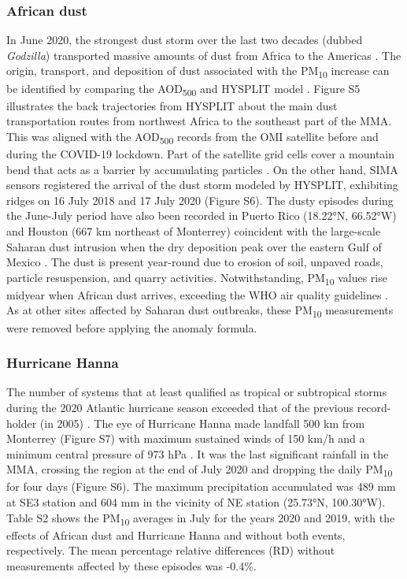 \documentclass[preprint,12pt]{elsarticle}
\begin{document}
\subsubsection*{African dust}
In June 2020, the strongest dust storm over the last two decades (dubbed \textit{Godzilla}) transported massive amounts of dust from Africa to the Americas \citep{Francis_2020}. The origin, transport, and deposition of dust associated with the PM\textsubscript{10} increase can be identified by comparing the AOD\textsubscript{500} and HYSPLIT model \citep{Yassin_2018}. Figure S5 illustrates the back trajectories from HYSPLIT about the main dust transportation routes from northwest Africa to the southeast part of the MMA. This was aligned with the AOD\textsubscript{500} records from the OMI satellite before and during the COVID-19 lockdown. Part of the satellite grid cells cover a mountain bend that acts as a barrier by accumulating particles \citep{Gonz_lez_Santiago_2011,Martinez_2012}. On the other hand, SIMA sensors registered the arrival of the dust storm modeled by HYSPLIT, exhibiting ridges on 16 July 2018 and 17 July 2020 (Figure S6). The dusty episodes during the June-July period have also been recorded in Puerto Rico (18.22°N, 66.52°W) \citep{Euphrasie_Clotilde_2020} and Houston (667 km northeast of Monterrey) coincident with the large-scale Saharan dust intrusion \citep{Bozlaker_2013} when the dry deposition peak over the eastern Gulf of Mexico \citep{Lenes_2012}. The dust is present year-round due to erosion of soil, unpaved roads, particle resuspension, and quarry activities. Notwithstanding, PM\textsubscript{10} values rise midyear when African dust arrives, exceeding the WHO air quality guidelines \citep{Prospero_2014}. As at other sites affected by Saharan dust outbreaks, these PM\textsubscript{10} measurements were removed \citep{Clemente_2022} before applying the anomaly formula.
\subsubsection*{Hurricane Hanna}
The number of systems that at least qualified as tropical or subtropical storms during the 2020 Atlantic hurricane season exceeded that of the previous record-holder (in 2005) \citep{stefano2021,Beven_2021}. The eye of Hurricane Hanna made landfall 500 km from Monterrey (Figure S7) with maximum sustained winds of 150 km/h and a minimum central pressure of 973 hPa \citep{conagua}. It was the last significant rainfall in the MMA, crossing the region at the end of July 2020 and dropping the daily PM\textsubscript{10} for four days (Figure S6). The maximum precipitation accumulated was 489 mm at SE3 station and 604 mm in the vicinity of NE station (25.73°N, 100.30°W). Table S2 shows the PM\textsubscript{10} averages in July for the years 2020 and 2019, with the effects of African dust and Hurricane Hanna and without both events, respectively. The mean percentage relative differences (RD) without measurements affected by these episodes was -0.4\%.
\end{document}
